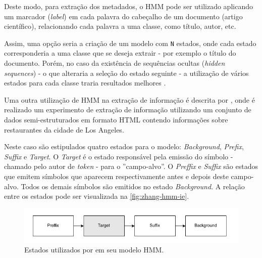 Deste modo, para extração dos metadados, o HMM pode ser utilizado aplicando um marcador (\textit{label}) em cada palavra do cabeçalho de um documento (artigo científico), relacionando cada palavra a uma classe, como título, autor, etc. \begin{textonovo}Assim, uma opção seria a criação de um modelo com \texttt{N} estados, onde cada estado corresponderia a uma classe que se deseja extrair - por exemplo o título do documento. Porém, no caso da existência de sequências ocultas (\textit{hidden sequences}) - o que alteraria a seleção do estado seguinte - a utilização de vários estados para cada classe traria resultados melhores \cite{Seymore-HMM-IE}.


Uma outra utilização de HMM na extração de informação é descrita por \cite{Zhang-HMM-IE}, onde é realizado um experimento de extração de informação utilizando um conjunto de dados semi-estruturados em formato HTML contendo informações sobre restaurantes da cidade de Los Angeles.

Neste caso são estipulados quatro estados para o modelo: \textit{Background}, \textit{Prefix}, \textit{Suffix} e \textit{Target}. O \textit{Target} é o estado responsável pela emissão do símbolo - chamado pelo autor de \textit{token} - para o ''campo-alvo''. O \textit{Preffix} e \textit{Suffix} são estados que emitem símbolos que aparecem respectivamente antes e depois deste campo-alvo. Todos os demais símbolos são emitidos no estado \textit{Background}. A relação entre os estados pode ser visualizada na \autoref{fig:zhang-hmm-ie}.

\begin{figure}
	\centering
	\caption{Estados utilizados por \cite{Zhang-HMM-IE} em seu modelo HMM.}
	\label{fig:zhang-hmm-ie}
	\includegraphics[width=0.8\linewidth]{./assets/zhang-hmm-ie}
\end{figure}


\end{textonovo}
